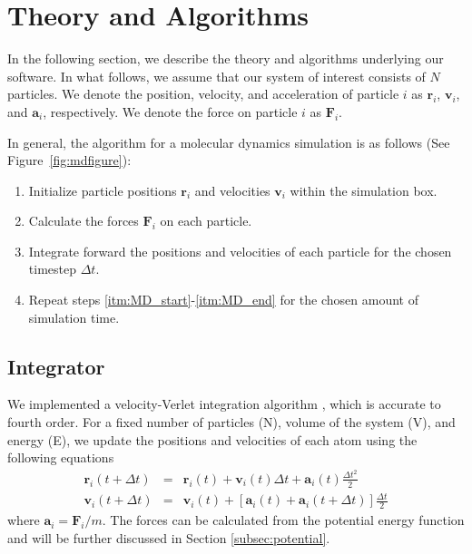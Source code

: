 \documentclass[12pt]{article}
\begin{document}
\section{Theory and Algorithms}

In the following section, we describe the theory and algorithms  underlying our software.
%
In what follows, we assume that our system of interest consists of $N$ particles.
%
We denote the position, velocity, and acceleration of particle $i$ as $\mathbf{r}_i$, $\mathbf{v}_i$, and $\mathbf{a}_i$, respectively.
%
We denote the force on particle $i$ as $\mathbf{F}_i$.

In general, the algorithm for a molecular dynamics simulation is as follows (See Figure~\ref{fig:mdfigure}):

\begin{enumerate}
\item Initialize particle positions $\mathbf{r}_i$ and velocities $\mathbf{v}_i$ within the simulation box.
\item  \label{itm:MD_start} Calculate the forces $\mathbf{F}_i$ on each particle.
\item \label{itm:MD_end} Integrate forward the positions and velocities of each particle for the chosen timestep $\Delta t$.
\item Repeat steps \ref{itm:MD_start}-\ref{itm:MD_end} for the chosen amount of simulation time.
\end{enumerate}


\subsection{Integrator} \label{subsec:integrator}

We implemented a velocity-Verlet integration algorithm \cite{Swope1982}, which is accurate to fourth order.
%
For a fixed number of particles (N), volume of the system (V), and energy (E), we update the positions and velocities of each atom using the following equations
\begin{eqnarray}
\mathbf{r}_i (t + \Delta t)  & = & \mathbf{r}_i(t) + \mathbf{v}_i(t) \Delta t + \mathbf{a}_i(t) \frac{\Delta t^2}{2} \\
\mathbf{v}_i(t + \Delta t) & = & \mathbf{v}_i(t) + \left[\mathbf{a}_i(t) + \mathbf{a}_i(t + \Delta t) \right] \frac{\Delta t}{2}
\end{eqnarray}
where $\mathbf{a}_i = \mathbf{F}_i/m$.
%
The forces can be calculated from the potential energy function and will be further discussed in Section \ref{subsec:potential}.
\end{document}
